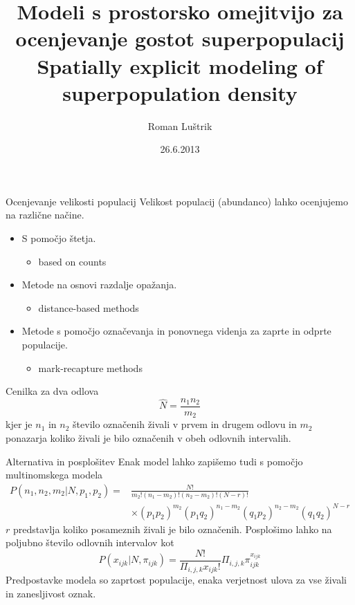 \documentclass{beamer}
\begin{document}
\title{Modeli s prostorsko omejitvijo za ocenjevanje gostot superpopulacij \\
\vspace{0.3cm}
Spatially explicit modeling of superpopulation density}
\author{Roman Luštrik}
\date{26.6.2013}

\begin{frame}
\titlepage
\end{frame}

\begin{frame}{Ocenjevanje velikosti populacij}
Velikost populacij (abundanco) lahko ocenjujemo na različne načine.
\begin{itemize}
\item{S pomočjo štetja.}
	\begin{itemize}
	\item[] \tiny{based on counts}
	\end{itemize}
\item{Metode na osnovi razdalje opažanja.}
	\begin{itemize}
	\item[] \tiny{distance-based methods}
	\end{itemize}
\item Metode s pomočjo označevanja in ponovnega videnja za zaprte in odprte populacije.
	\begin{itemize}
	\item[] \tiny{mark-recapture methods}
	\end{itemize}
\end{itemize}
\end{frame}

\begin{frame}{Cenilka za dva odlova}
$$\hat{N} = \frac{n_1 n_2}{m_2}$$
kjer je $n_1$ in $n_2$ število označenih živali v prvem in drugem odlovu in $m_2$ ponazarja koliko živali je bilo označenih v obeh odlovnih intervalih.
\end{frame}

\begin{frame}{Alternativa in posplošitev}
Enak model lahko zapišemo tudi s pomočjo multinomskega modela
\begin{align*}
P(n_1, n_2, m_2 | N, p_1, p_2) = & \frac{N!}{m_2!(n_1-m_2)!(n_2-m_2)!(N-r)!} \\ 
& \times (p_1p_2)^{m_2} (p_1q_2)^{n_1-m_2}(q_1p_2)^{n_2-m_2}(q_1q_2)^{N-r}
\end{align*}
$r$ predstavlja koliko posameznih živali je bilo označenih. Posplošimo lahko na poljubno število odlovnih intervalov kot
$$P(x_{ijk}|N, \pi_{ijk}) = \frac{N!}{\Pi_{i,j,k} x_{ijk}!} \Pi_{i,j,k} \pi_{ijk}^{x_{ijk}}$$
Predpostavke modela so zaprtost populacije, enaka verjetnost ulova za vse živali in zanesljivost oznak.
\end{frame}
\end{document}
